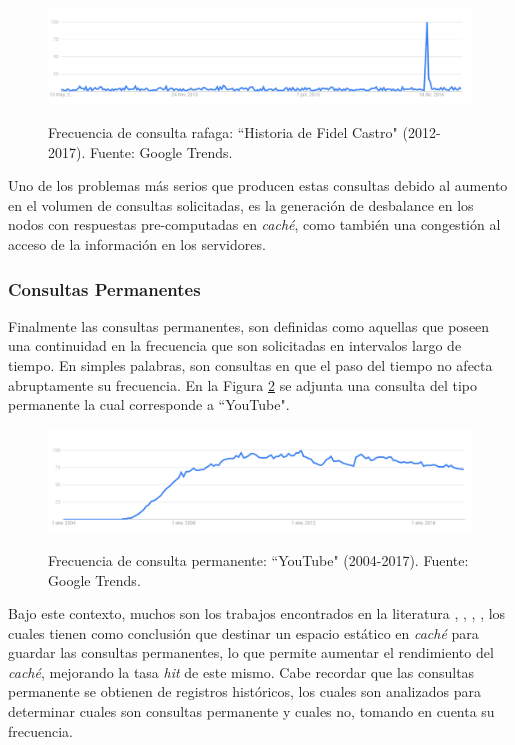 \documentclass[12pt]{ociamthesis}  %
\begin{document}
\begin{figure}[!htb]
	\centering
	\includegraphics[width=15cm]{historia_Fidel_Castro.png}\\
	\caption{Frecuencia de consulta rafaga: ``Historia de Fidel Castro" (2012-2017). Fuente: Google Trends.}
	\label{google_trend_histo_Fidel_Cas}
\end{figure}

Uno de los problemas más serios que producen estas consultas debido al aumento en el volumen de consultas solicitadas, es la generación de desbalance en los nodos con respuestas pre-computadas en \textit{caché}, como también una congestión al acceso de la información en los servidores.\\
\clearpage

\subsubsection{Consultas Permanentes}
Finalmente las consultas permanentes, son definidas como aquellas que poseen una continuidad en la frecuencia que son solicitadas en intervalos largo de tiempo. En simples palabras, son consultas en que el paso del tiempo no afecta abruptamente su frecuencia. En la Figura \ref{google_trend_google} se adjunta una consulta del tipo permanente la cual corresponde a ``YouTube".\\

\begin{figure}[!htb]
	\centering
	\includegraphics[width=15cm]{YouTube.png}\\
	\caption{Frecuencia de consulta permanente: ``YouTube" (2004-2017). Fuente: Google Trends.}
	\label{google_trend_google}
\end{figure}

Bajo este contexto, muchos son los trabajos encontrados en la literatura \cite{zhang2013two}, \cite{markatos2001caching}, \cite{ozcan2012five}, \cite{kumar2008new}, los cuales tienen como conclusión que destinar un espacio estático en \textit{caché} para guardar las consultas permanentes, lo que permite aumentar el rendimiento del \textit{caché}, mejorando la tasa \textit{hit} de este mismo. Cabe recordar que las consultas permanente se obtienen de registros históricos, los cuales son analizados para determinar cuales son consultas permanente y cuales no, tomando en cuenta su frecuencia. \\ 
\end{document}
